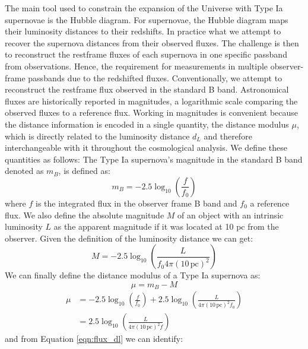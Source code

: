 The main tool used to constrain the expansion of the Universe with Type Ia supernovae is the Hubble diagram. For supernovae, the Hubble diagram maps their luminosity distances 
to their redshifts. In practice what we attempt to recover the supernova distances from their observed fluxes. The challenge is then to reconstruct the restframe fluxes 
of each supernova in one specific passband from observations. Hence, the requirement for measurements in multiple observer-frame passbands due to the redshifted fluxes. 
Conventionally, we attempt to reconstruct the restframe flux observed in the standard B band. 
Astronomical fluxes are historically reported in magnitudes, a 
logarithmic scale comparing the observed fluxes to a reference flux. Working 
in magnitudes is convenient because the distance information is 
encoded in a single quantity, the distance modulus $\mu$, which is 
directly related to the luminosity distance $d_L$ and therefore 
interchangeable with it throughout the cosmological analysis. We 
define these quantities as follows: 
The Type Ia supernova's magnitude in the standard B band denoted as $m_B$, is defined as:
\begin{equation}
    m_B = -2.5 \log_{10}\left( \frac{f}{f_0} \right)
\end{equation}
where $f$ is the integrated flux in the observer frame B band and $f_0$ a reference flux. We also define the absolute magnitude $M$ of an object with an intrinsic 
luminosity $L$ as the apparent magnitude if it was located at 10 pc from the observer. Given the definition of the luminosity distance we can get:
\begin{equation}
    M = -2.5 \log_{10}\left( \frac{L}{f_0 4 \pi (10 \, \text{pc})^2} \right)
\end{equation}
We can finally define the distance modulus of a Type Ia supernova as:
\begin{equation}
    \mu = m_B - M
\end{equation}
\begin{align}
    \mu
    &= -2.5 \log_{10}\left(\frac{f}{f_0}\right)
    + 2.5 \log_{10}\left(\frac{L}{4\pi (10\,\text{pc})^2 f_0}\right)\\
    &= 2.5 \log_{10}\left(
    \frac{L}{4\pi (10\,\text{pc})^2 f}
    \right)
\end{align}
and from Equation \ref{eqn:flux_dl} we can identify:

